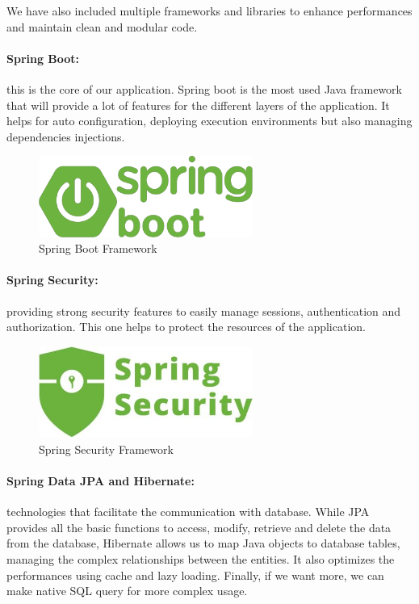 \documentclass[12pt,a4paper,table,english]{article}
\begin{document}
	We have also included multiple frameworks and libraries to enhance performances and maintain clean and modular code.\\
	
	\paragraph{Spring Boot:} this is the core of our application. Spring boot is the most used Java framework that will provide a lot of features for the different layers of the application. It helps for auto configuration, deploying execution environments but also managing dependencies injections.
	
		
	\begin{figure}[H]
		\centering
		\includegraphics[width=70mm]{Image/springboot}
		\caption{Spring Boot Framework}
		\label{fig:Spring Boot Framework}
	\end{figure}
	
	
	\paragraph{Spring Security:} providing strong security features to easily manage sessions, authentication and authorization. This one helps to protect the resources of the application.
	
	\begin{figure}[H]
		\centering
		\includegraphics[width=70mm]{Image/springsecurity}
		\caption{Spring Security Framework}
		\label{fig:Spring Security Framework}
	\end{figure}
	
	\paragraph{Spring Data JPA and Hibernate:} technologies that facilitate the communication with database. While JPA provides all the basic functions \citep{JPA2, JPA1} to access, modify, retrieve and delete the data from the database, Hibernate allows us to map Java objects to database tables, managing the complex relationships between the entities. It also optimizes the performances using cache and lazy loading. Finally, if we want more, we can make native SQL query \citep{JPA3} for more complex usage.
	
\end{document}
